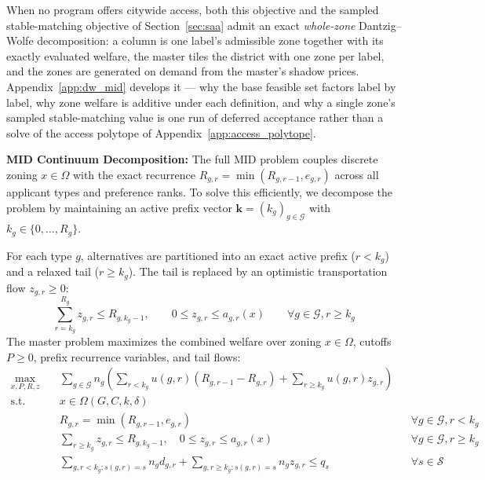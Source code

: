 \documentclass{article}
\begin{document}
When no program offers citywide access, both this objective and the sampled stable-matching objective of Section~\ref{sec:saa} admit an exact \emph{whole-zone} Dantzig--Wolfe decomposition: a column is one label's admissible zone together with its exactly evaluated welfare, the master tiles the district with one zone per label, and the zones are generated on demand from the master's shadow prices. Appendix~\ref{app:dw_mid} develops it --- why the base feasible set factors label by label, why zone welfare is additive under each definition, and why a single zone's sampled stable-matching value is one run of deferred acceptance rather than a solve of the access polytope of Appendix~\ref{app:access_polytope}.

\noindent\textbf{MID Continuum Decomposition:} 
The full MID problem couples discrete zoning $x \in \Omega$ with the exact recurrence $R_{g,r} = \min(R_{g,r-1}, e_{g,r})$ across all applicant types and preference ranks. To solve this efficiently, we decompose the problem by maintaining an active prefix vector $\mathbf{k} = (k_g)_{g \in \mathcal{G}}$ with $k_g \in \{0, \dots, R_g\}$.

For each type $g$, alternatives are partitioned into an exact active prefix ($r < k_g$) and a relaxed tail ($r \geq k_g$). The tail is replaced by an optimistic transportation flow $z_{g,r} \ge 0$:
\begin{equation}
\sum_{r = k_g}^{R_g} z_{g,r} \leq R_{g, k_g-1}, \qquad 0 \leq z_{g,r} \leq a_{g,r}(x) \qquad \forall g \in \mathcal{G}, r \geq k_g
\end{equation}
The master problem maximizes the combined welfare over zoning $x \in \Omega$, cutoffs $P \ge 0$, prefix recurrence variables, and tail flows:
\begin{equation}\label{eq:mid_master}
\begin{aligned}
\max_{x, P, R, z} \quad & \sum_{g \in \mathcal{G}} n_g \left( \sum_{r < k_g} u(g,r) (R_{g,r-1} - R_{g,r}) + \sum_{r \geq k_g} u(g,r) z_{g,r} \right) \\
\text{s.t.} \quad & x \in \Omega(G, C, k, \delta) \\
& R_{g,r} = \min(R_{g,r-1}, e_{g,r}) && \forall g \in \mathcal{G}, r < k_g \\
& \sum_{r \geq k_g} z_{g,r} \leq R_{g, k_g-1}, \quad 0 \leq z_{g,r} \leq a_{g,r}(x) && \forall g \in \mathcal{G}, r \geq k_g \\
& \sum_{g, r < k_g : s(g,r)=s} n_g d_{g,r} + \sum_{g, r \geq k_g : s(g,r)=s} n_g z_{g,r} \leq q_s && \forall s \in \mathcal{S}
\end{aligned}
\end{equation}
\end{document}

